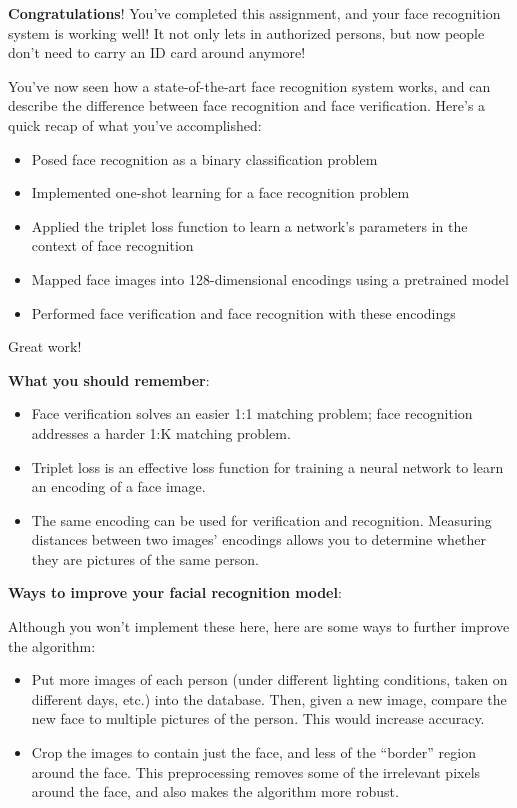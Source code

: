 \documentclass[11pt]{article}
\providecommand{\tightlist}{%
      \setlength{\itemsep}{0pt}\setlength{\parskip}{0pt}}
\begin{document}
    \textbf{Congratulations}! You've completed this assignment, and your
face recognition system is working well! It not only lets in authorized
persons, but now people don't need to carry an ID card around anymore!

You've now seen how a state-of-the-art face recognition system works,
and can describe the difference between face recognition and face
verification. Here's a quick recap of what you've accomplished:

\begin{itemize}
\tightlist
\item
  Posed face recognition as a binary classification problem
\item
  Implemented one-shot learning for a face recognition problem
\item
  Applied the triplet loss function to learn a network's parameters in
  the context of face recognition
\item
  Mapped face images into 128-dimensional encodings using a pretrained
  model
\item
  Performed face verification and face recognition with these encodings
\end{itemize}

Great work!

    \textbf{What you should remember}:

\begin{itemize}
\item
  Face verification solves an easier 1:1 matching problem; face
  recognition addresses a harder 1:K matching problem.
\item
  Triplet loss is an effective loss function for training a neural
  network to learn an encoding of a face image.
\item
  The same encoding can be used for verification and recognition.
  Measuring distances between two images' encodings allows you to
  determine whether they are pictures of the same person.
\end{itemize}

    \textbf{Ways to improve your facial recognition model}:

Although you won't implement these here, here are some ways to further
improve the algorithm:

\begin{itemize}
\item
  Put more images of each person (under different lighting conditions,
  taken on different days, etc.) into the database. Then, given a new
  image, compare the new face to multiple pictures of the person. This
  would increase accuracy.
\item
  Crop the images to contain just the face, and less of the ``border''
  region around the face. This preprocessing removes some of the
  irrelevant pixels around the face, and also makes the algorithm more
  robust.
\end{itemize}
\end{document}
